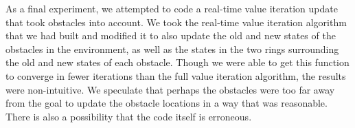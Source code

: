 \documentclass{aiaa-tc}%
\begin{document}
\clearpage
\begin{verbatim}

\end{verbatim}
As a final experiment, we attempted to code a real-time value iteration update that took obstacles into account. We took the real-time value iteration algorithm that we had built and modified it to also update the old and new states of the obstacles in the environment, as well as the states in the two rings surrounding the old and new states of each obstacle. Though we were able to get this function to converge in fewer iterations than the full value iteration algorithm, the results were non-intuitive. We speculate that perhaps the obstacles were too far away from the goal to update the obstacle locations in a way that was reasonable. There is also a possibility that the code itself is erroneous.
\end{document}
